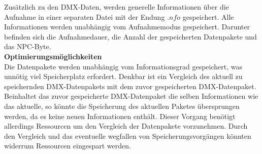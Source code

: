 Zusätzlich zu den DMX-Daten, werden generelle Informationen über die Aufnahme in einer separaten Datei mit der Endung $.nfo$ gespeichert. Alle Informationen werden unabhängig vom Aufnahmemodus gespeichert. Darunter befinden sich die Aufnahmedauer, die Anzahl der gespeicherten Datenpakete und das NPC-Byte.\\
\newline
\textbf{Optimierungsmöglichkeiten}\\
Die Datenpakete werden unabhängig vom Informationsgrad gespeichert, was unnötig viel Speicherplatz erfordert. Denkbar ist ein Vergleich des aktuell zu speichernden DMX-Datenpakets mit dem zuvor gespeicherten DMX-Datenpaket. Beinhaltet das zuvor gespeicherte DMX-Datenpaket die selben Informationen wie das aktuelle, so könnte die Speicherung des aktuellen Paketes übersprungen werden, da es keine neuen Informationen enthält. Dieser Vorgang benötigt allerdings Ressourcen um den Vergleich der Datenpakete vorzunehmen. Durch den Vergleich und das eventuelle wegfallen von Speicherungsvorgängen könnten widerrum Ressourcen eingespart werden.